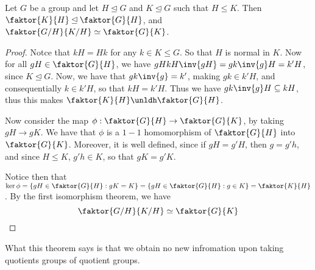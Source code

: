 \begin{theorem}\label{3.4.3}
    Let $G$ be a group and let  $H \unlhd G$ and  $K \unlhd G$ such that  $H
    \leq K$. Then $\faktor{K}{H} \unlhd \faktor{G}{H}$, and
    $\faktor{G/H}{K/H} \simeq \faktor{G}{K}$.
\end{theorem}
\begin{proof}
    Notce that $kH=Hk$ for any $k \in K \leq G$. So that  $H$ is normal in  $K$.
    Now for all $gH \in \faktor{G}{H}$, we have $gHkH\inv{gH}=gk\inv{g}H=k'H$,
    since $K \unlhd G$. Now, we have that $gk\inv{g}=k'$, making $gk \in k'H$,
    and consequentially  $k \in k'H$, so that  $kH=k'H$. Thus we have
    $gk\inv{g}H \subseteq kH$, thus this makes $\faktor{K}{H} \unldh
    \faktor{G}{H}$.

    Now consider the map $\phi:\faktor{G}{H} \rightarrow \faktor{G}{K}$, by
    taking $gH \rightarrow gK$. We have that $\phi$ is a  $1-1$ homomorphism of
     $\faktor{G}{H}$ into $\faktor{G}{K}$. Moreover, it is well defined, since
     if $gH=g'H$, then $g=g'h$, and since $H \leq K$,  $g'h \in K$, so that
     $gK=g'K$.

     Notice then that  $\ker{\phi}=\{gH \in \faktor{G}{H} : gK=K\}=\{gH \in
         \faktor{G}{H} : g \in K\}=\faktor{K}{H}$. By the first isomorphism
         theorem, we have
         \begin{equation*}
             \faktor{G/H}{K/H} \simeq \faktor{G}{K}
         \end{equation*}
\end{proof}
\begin{remark}
    What this theorem says is that we obtain no new infromation upon taking
    quotients groups of quotient groups.
\end{remark}

